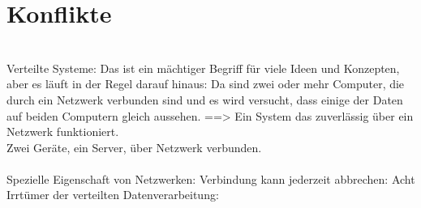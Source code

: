 \section{\label{sec:conflict}Konflikte}
\\
Verteilte Systeme: Das ist ein mächtiger Begriff für viele Ideen und Konzepten, aber es läuft in der Regel darauf hinaus: Da sind zwei oder mehr Computer, die durch ein Netzwerk verbunden sind und es wird versucht, dass einige der Daten auf beiden Computern gleich aussehen. ==> Ein System das zuverlässig über ein Netzwerk funktioniert.\\
Zwei Geräte, ein Server, über Netzwerk verbunden.\\\\
Spezielle Eigenschaft von Netzwerken: Verbindung kann jederzeit abbrechen:
Acht Irrtümer der verteilten Datenverarbeitung:
